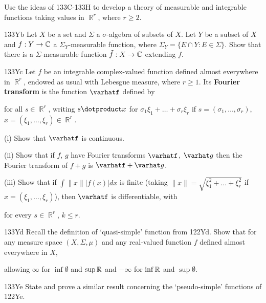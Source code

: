 { 
 
      
Use the ideas of 133C-133H to develop a theory of measurable and 
integrable functions taking values in $\BbbR^r$, where $r\ge 2$. 
      
\spheader 133Yb Let $X$ be a set and $\Sigma$ a $\sigma$-algebra 
of subsets of $X$.   Let $Y$ be a subset of $X$ and $f:Y\to\Bbb C$ a 
$\Sigma_Y$-measurable function, where $\Sigma_Y=\{E\cap Y:E\in\Sigma\}$. 
Show that there is a $\Sigma$-measurable function $\tilde f:X\to\Bbb C$ 
extending $f$.   
      
\spheader 133Yc Let $f$ be an integrable complex-valued function 
defined almost everywhere in $\BbbR^r$, endowed as usual with Lebesgue 
measure, where $r\ge 1$.   Its {\bf Fourier transform} is the function 
$\varhatf$ defined by 
      
      
\noindent for all $s\in\BbbR^r$, writing $s\dotproduct x$ for 
$\sigma_1\xi_1+\ldots+\sigma_r\xi_r$ if $s=(\sigma_1,\ldots,\sigma_r)$, 
$x=(\xi_1,\ldots,\xi_r)\in\BbbR^r$. 
      
\quad(i) Show that $\varhatf$ is continuous.   
      
\quad(ii) Show that if $f$, $g$ have Fourier transforms $\varhatf$, 
$\varhat g$ then the Fourier transform of $f+g$ is $\varhatf+\varhat g$. 
      
\quad (iii) Show that if $\int\|x\||f(x)|dx$ is finite
(taking $\|x\|=\sqrt{\xi_1^2+\ldots+\xi_r^2}$ if 
$x=(\xi_1,\dots,\xi_r)$), then $\varhatf$ is differentiable, with 
      
      
\noindent for every $s\in\BbbR^r$, $k\le r$. 
      
\spheader 133Yd Recall the definition of `quasi-simple' 
function from 122Yd.   Show that for any measure space $(X,\Sigma,\mu)$ 
and any real-valued function $f$ defined almost everywhere in $X$, 
      
      
      
\noindent allowing $\infty$ for $\inf\emptyset$ and $\sup\Bbb R$ and 
$-\infty$ for $\inf\Bbb R$ and $\sup\emptyset$. 
      
\spheader 133Ye State and prove a similar result concerning the 
`pseudo-simple' functions of 122Ye. 
}%
      
